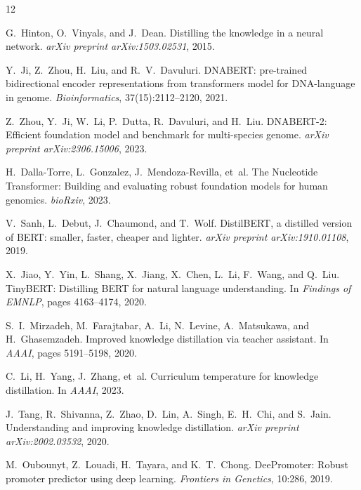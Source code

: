 \documentclass{article}
\begin{document}

\begin{thebibliography}{12}

G.~Hinton, O.~Vinyals, and J.~Dean.
Distilling the knowledge in a neural network.
\emph{arXiv preprint arXiv:1503.02531}, 2015.

Y.~Ji, Z.~Zhou, H.~Liu, and R.~V.~Davuluri.
{DNABERT}: pre-trained bidirectional encoder representations from transformers model for {DNA}-language in genome.
\emph{Bioinformatics}, 37(15):2112--2120, 2021.

Z.~Zhou, Y.~Ji, W.~Li, P.~Dutta, R.~Davuluri, and H.~Liu.
{DNABERT-2}: Efficient foundation model and benchmark for multi-species genome.
\emph{arXiv preprint arXiv:2306.15006}, 2023.

H.~Dalla-Torre, L.~Gonzalez, J.~Mendoza-Revilla, et~al.
The {Nucleotide Transformer}: Building and evaluating robust foundation models for human genomics.
\emph{bioRxiv}, 2023.

V.~Sanh, L.~Debut, J.~Chaumond, and T.~Wolf.
{DistilBERT}, a distilled version of {BERT}: smaller, faster, cheaper and lighter.
\emph{arXiv preprint arXiv:1910.01108}, 2019.

X.~Jiao, Y.~Yin, L.~Shang, X.~Jiang, X.~Chen, L.~Li, F.~Wang, and Q.~Liu.
{TinyBERT}: Distilling {BERT} for natural language understanding.
In \emph{Findings of EMNLP}, pages 4163--4174, 2020.

S.~I.~Mirzadeh, M.~Farajtabar, A.~Li, N.~Levine, A.~Matsukawa, and H.~Ghasemzadeh.
Improved knowledge distillation via teacher assistant.
In \emph{AAAI}, pages 5191--5198, 2020.

C.~Li, H.~Yang, J.~Zhang, et~al.
Curriculum temperature for knowledge distillation.
In \emph{AAAI}, 2023.

J.~Tang, R.~Shivanna, Z.~Zhao, D.~Lin, A.~Singh, E.~H.~Chi, and S.~Jain.
Understanding and improving knowledge distillation.
\emph{arXiv preprint arXiv:2002.03532}, 2020.

M.~Oubounyt, Z.~Louadi, H.~Tayara, and K.~T.~Chong.
{DeePromoter}: Robust promoter predictor using deep learning.
\emph{Frontiers in Genetics}, 10:286, 2019.


\end{thebibliography}
\end{document}
